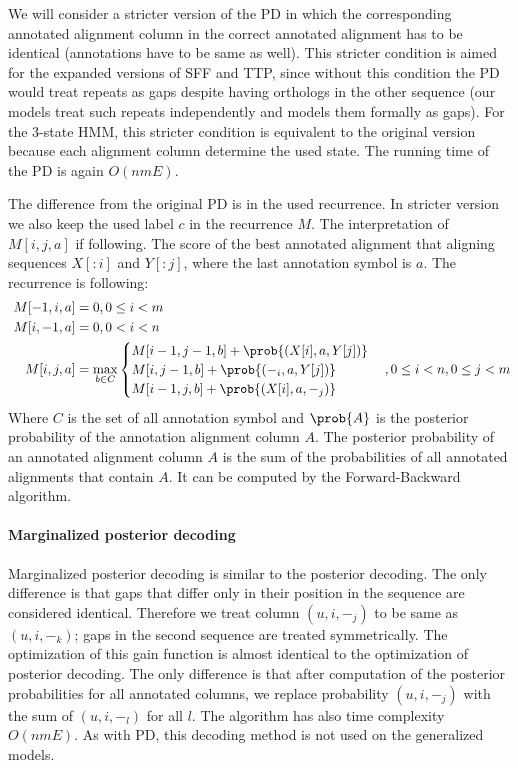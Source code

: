 We will consider a stricter version of the PD in which the corresponding
annotated alignment column in the correct annotated alignment has to be
identical (annotations have to be same as well). This stricter condition is
aimed for the expanded versions of SFF and TTP, since without this condition
the PD would treat repeats as gaps despite having orthologs in the other
sequence (our models treat such repeats independently and models them formally
as gaps). For the 3-state HMM, this stricter condition is equivalent to the
original version because each alignment column determine the used state.
The running time of the PD is again $O(nmE)$. 

The difference from the original PD is in the used recurrence. In stricter
version we also keep the used label $c$ in the recurrence $M$. The
interpretation of $M[i,j,a]$ if following.  The score of the best annotated
alignment that aligning sequences $X[:i]$ and $Y[:j]$, where the last
annotation symbol is $a$. The recurrence is following:
\begin{align} 
M[-1,i,a] &= 0, 0\leq i < m\\\
M[i,-1,a] &= 0, 0< i < n\\
M[i,j,a] &= \max_{b\in C}
\begin{cases}
 M[i-1,j-1,b]+\prob{(X[i],a, Y[j])}\\
 M[i,j-1,b]+\prob{(-_{i},a, Y[j])}\\
 M[i-1,j,b]+\prob{(X[i],a, -_{j})}
\end{cases}, 0\leq i<n,0\leq j<m 
\end{align}
Where $C$ is the set of all annotation symbol and $\prob{A}$ is the posterior
probability of the annotation alignment column $A$. The posterior probability
of an annotated alignment column $A$ is the sum of the probabilities of all
annotated alignments that contain $A$. It can be computed by the
Forward-Backward algorithm.

\paragraph{Marginalized posterior decoding}
Marginalized posterior decoding is similar to the posterior decoding. The only
difference is that gaps that differ only in their position in the sequence are
considered identical.  Therefore we treat column $(u, i, -_j)$ to be same as
$(u, i, -_k)$; gaps in the second sequence are treated symmetrically. The
optimization of this gain function is almost identical to the optimization of
posterior decoding. The only difference is that after computation of the
posterior probabilities for all annotated columns, we replace probability $(u, i, -_j)$ with the sum of
$(u, i, -_l)$ for all $l$. The algorithm has also time complexity $O(nmE)$.  As
with PD, this decoding method is not used on the generalized models.

